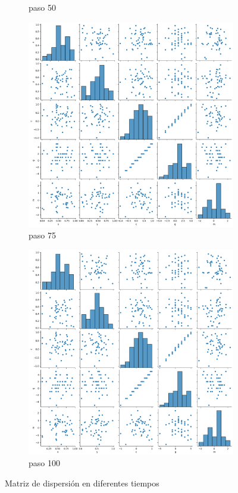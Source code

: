 \documentclass{article}
\begin{document}
\begin{figure}[H]
\begin{subfigure}[b]{0.45\linewidth}
            \caption{paso 50}
            \label{f2.b}
        \end{subfigure}
\begin{subfigure}[b]{0.45\linewidth}
            \includegraphics[width=\linewidth]{tiempsop_t075.png}
            \caption{paso 75}
            \label{f2.b}
        \end{subfigure}
\begin{subfigure}[b]{0.45\linewidth}
            \includegraphics[width=\linewidth]{tiempsop_t100.png}
            \caption{paso 100}
            \label{f2.b}
        \end{subfigure}
\caption{Matriz de dispersi\'on en diferentes tiempos}
        \label{f4}
\end{figure}
\end{document}
